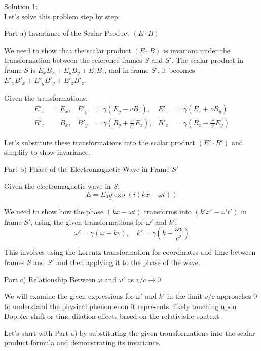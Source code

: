 \documentclass[a4paper,11pt]{article}
\begin{document}
\bigskip

\noindent Solution 1: \\

Let's solve this problem step by step:

Part a) Invariance of the Scalar Product \( (\underline{E} \cdot \underline{B}) \)

We need to show that the scalar product \( (\underline{E} \cdot \underline{B}) \) is invariant under the transformation between the reference frames \( S \) and \( S' \). The scalar product in frame \( S \) is \( E_x B_x + E_y B_y + E_z B_z \), and in frame \( S' \), it becomes \( E'_x B'_x + E'_y B'_y + E'_z B'_z \).

Given the transformations:
\[
\begin{aligned}
E'_{x} &= E_{x}, & E'_{y} &= \gamma(E_{y} - vB_{z}), & E'_{z} &= \gamma(E_{z} + vB_{y}) \\
B'_{x} &= B_{x}, & B'_{y} &= \gamma(B_{y} + \frac{v}{c^{2}} E_{z}), & B'_{z} &= \gamma(B_{z} - \frac{v}{c^{2}} E_{y})
\end{aligned}
\]

Let's substitute these transformations into the scalar product \( (\underline{E}' \cdot \underline{B}') \) and simplify to show invariance.

Part b) Phase of the Electromagnetic Wave in Frame \( S' \)

Given the electromagnetic wave in \( S \):
\[ \underline{E} = E_{0} \hat{\underline{y}} \exp(i(kx - \omega t)) \]

We need to show how the phase \( (kx - \omega t) \) transforms into \( (k'x' - \omega' t') \) in frame \( S' \), using the given transformations for \(\omega'\) and \(k'\):
\[ \omega' = \gamma(\omega - kv), \quad k' = \gamma(k - \frac{\omega v}{c^{2}}) \]

This involves using the Lorentz transformation for coordinates and time between frames \( S \) and \( S' \) and then applying it to the phase of the wave.

Part c) Relationship Between \( \omega \) and \( \omega' \) as \( v/c \rightarrow 0 \)

We will examine the given expressions for \( \omega' \) and \( k' \) in the limit \( v/c \) approaches \( 0 \) to understand the physical phenomenon it represents, likely touching upon Doppler shift or time dilation effects based on the relativistic context.

Let's start with Part a) by substituting the given transformations into the scalar product formula and demonstrating its invariance.
\end{document}
